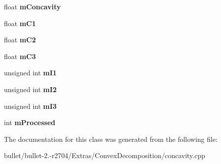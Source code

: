 \begin{DoxyCompactItemize}
\item 
\hypertarget{class_convex_decomposition_1_1_c_tri_ae81c4136022999a7d1c1553dc80943ef}{float {\bfseries m\+Concavity}}\label{class_convex_decomposition_1_1_c_tri_ae81c4136022999a7d1c1553dc80943ef}

\item 
\hypertarget{class_convex_decomposition_1_1_c_tri_ab5f556aa2f92e591307282c347ceb845}{float {\bfseries m\+C1}}\label{class_convex_decomposition_1_1_c_tri_ab5f556aa2f92e591307282c347ceb845}

\item 
\hypertarget{class_convex_decomposition_1_1_c_tri_a260141e164d14df5b2fcd7b5808ba4a7}{float {\bfseries m\+C2}}\label{class_convex_decomposition_1_1_c_tri_a260141e164d14df5b2fcd7b5808ba4a7}

\item 
\hypertarget{class_convex_decomposition_1_1_c_tri_a77c5a54ba8607231035c0b86265a9652}{float {\bfseries m\+C3}}\label{class_convex_decomposition_1_1_c_tri_a77c5a54ba8607231035c0b86265a9652}

\item 
\hypertarget{class_convex_decomposition_1_1_c_tri_ad1d7c10e5350668a884e8cc91d44d509}{unsigned int {\bfseries m\+I1}}\label{class_convex_decomposition_1_1_c_tri_ad1d7c10e5350668a884e8cc91d44d509}

\item 
\hypertarget{class_convex_decomposition_1_1_c_tri_ab2a0c05fea71dcf3ebdbcf70c326f598}{unsigned int {\bfseries m\+I2}}\label{class_convex_decomposition_1_1_c_tri_ab2a0c05fea71dcf3ebdbcf70c326f598}

\item 
\hypertarget{class_convex_decomposition_1_1_c_tri_a060001e1e205756fb8fd6e088d37f1f4}{unsigned int {\bfseries m\+I3}}\label{class_convex_decomposition_1_1_c_tri_a060001e1e205756fb8fd6e088d37f1f4}

\item 
\hypertarget{class_convex_decomposition_1_1_c_tri_adfa73a62a0d73ae725c7d664a56236ae}{int {\bfseries m\+Processed}}\label{class_convex_decomposition_1_1_c_tri_adfa73a62a0d73ae725c7d664a56236ae}

\end{DoxyCompactItemize}


The documentation for this class was generated from the following file\+:\begin{DoxyCompactItemize}
\item 
bullet/bullet-\/2.-\/r2704/\+Extras/\+Convex\+Decomposition/concavity.\+cpp\end{DoxyCompactItemize}

